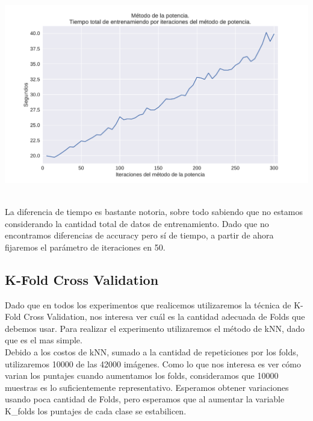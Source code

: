{\centering
    \includegraphics[scale=0.55]{informe/imagenes/potencia/tiempoPorIters.pdf} \\
}
$ $\newline

La diferencia de tiempo es bastante notoria, sobre todo sabiendo que no estamos considerando la cantidad total de datos de entrenamiento. Dado que no encontramos diferencias de accuracy pero sí de tiempo, a partir de ahora fijaremos el parámetro de iteraciones en 50. \\

\newpage
\subsection{K-Fold Cross Validation}

Dado que en todos los experimentos que realicemos utilizaremos la técnica de K-Fold Cross Validation, nos interesa ver cuál es la cantidad adecuada de Folds que debemos usar. Para realizar el experimento utilizaremos el método de kNN, dado que es el mas simple. \\

Debido a los costos de kNN, sumado a la cantidad de repeticiones por los folds, utilizaremos 10000 de las 42000 imágenes. Como lo que nos interesa es ver cómo varian los puntajes cuando aumentamos los folds, consideramos que 10000 muestras es lo suficientemente representativo. Esperamos obtener variaciones usando poca cantidad de Folds, pero esperamos que al aumentar la variable K_folds los puntajes de cada clase se estabilicen. \\

